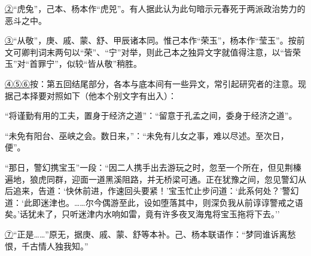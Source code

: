 {\href{../Text/part0009_split_000.html\#navto_2_a}{②}``虎兔''，己本、杨本作``虎兕''。}有人据此{认为此句暗示元春死于两派政治势力的恶斗之中。}

{\href{../Text/part0009_split_000.html\#navto_3_a}{③}``从敬''，庚、戚、蒙、舒、甲辰诸本同。惟己本作``荣玉''，杨本作``莹玉''。按前文可卿判词末两句以``荣''、``宁''对举，则此己本之独异文字就值得注意，以``皆荣玉''对``首罪宁''，似较``皆从敬''稍胜。}

{\href{../Text/part0009_split_000.html\#navto_4_a}{④}\href{../Text/part0009_split_000.html\#navto_5_a}{⑤}\href{../Text/part0009_split_000.html\#navto_6_a}{⑥}按：第五回结尾部分，各本与底本间有一些异文，常引起研究者的注意。现据己本择要对照如下（他本个别文字有出入）：}

{``将谨勤有用的工夫，置身于经济之道''：``留意于孔孟之间，委身于经济之道''。}

{``未免有阳台、巫峡之会。数日来，''：``未免有儿女之事，难以尽述。至次日，便''。}

{``那日，警幻携宝玉''一段：``因二人携手出去游玩之时，忽至一个所在，但见荆榛遍地，狼虎同群，迎面一道黑溪阻路，并无桥梁可通。正在犹豫之间，忽见警幻从后追来，告道：`快休前进，作速回头要紧！'宝玉忙止步问道：`此系何处？'警幻道：`此即迷津也。\ldots{}\ldots{}尔今偶游至此，设如堕落其中，则深负我从前谆谆警戒之语矣。'话犹未了，只听迷津内水响如雷，竟有许多夜叉海鬼将宝玉拖将下去。''}

{\href{../Text/part0009_split_000.html\#navto_7_a}{⑦}``正是\ldots{}\ldots{}''原无，据庚、戚、蒙、舒等本补。己、杨本联语作：``梦同谁诉离愁恨，千古情人独我知。''}
